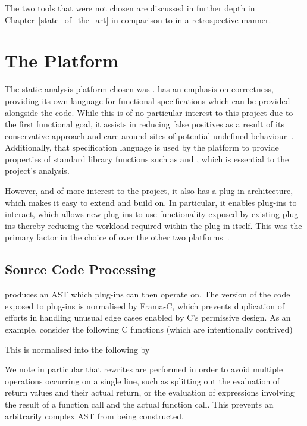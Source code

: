 The two tools that were not chosen are discussed in further depth in Chapter~\ref{state_of_the_art} in comparison to  in a retrospective manner.

\section{The  Platform}

The static analysis platform chosen was .  has an emphasis on correctness, providing its own language for functional specifications which can be provided alongside the code. While this is of no particular interest to this project due to the first functional goal, it assists in reducing false positives as a result of its conservative approach and care around sites of potential undefined behaviour~\cite{framauser}. Additionally, that specification language is used by the platform to provide properties of standard library functions such as \malloc{} and \free{}, which is essential to the project's analysis.

However, and of more interest to the project, it also has a plug-in architecture, which makes it easy to extend and build on. In particular, it enables plug-ins to interact, which allows new plug-ins to use functionality exposed by existing plug-ins thereby reducing the workload required within the plug-in itself. This was the primary factor in the choice of  over the other two platforms~\cite{framaarch}.

\subsection{Source Code Processing}

 produces an AST which plug-ins can then operate on. The version of the code exposed to plug-ins is normalised by Frama-C, which prevents duplication of efforts in handling unusual edge cases enabled by C's permissive design. As an example, consider the following C functions (which are intentionally contrived)



This is normalised into the following by 



We note in particular that rewrites are performed in order to avoid multiple operations occurring on a single line, such as splitting out the evaluation of return values and their actual return, or the evaluation of expressions involving the result of a function call and the actual function call. This prevents an arbitrarily complex AST from being constructed.

